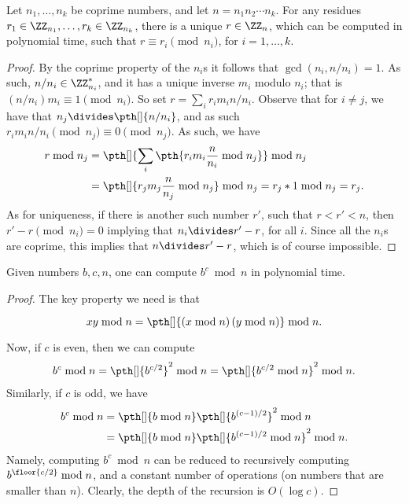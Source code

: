 \begin{theorem}%
    Let $n_1, \ldots, n_k$ be coprime numbers, and let $n = n_1 n_2
    \cdots n_k$. For any residues $r_1 \in \ZZ_{n_1}, \ldots, r_k \in
    \ZZ_{n_k}$, there is a unique $r \in \ZZ_n$, which can be computed
    in polynomial time, such that $r \equiv r_i \pmod{n_i}$, for $i=1,
    \ldots, k$.
\end{theorem}
\begin{proof}
    By the coprime property of the $n_i${}s it follows that $\gcd(n_i,
    n/n_i) = 1$. As such, $n/n_i \in \ZZ_{n_i}^*$, and it has a unique
    inverse $m_i$ modulo $n_i$; that is $(n/n_i) m_i \equiv 1
    \pmod{n_i}$. So set $r = \sum_i r_i m_i n/n_i$. Observe that for
    $i \neq j$, we have that $n_j \divides \pth[]{n/n_i}$, and as such
    $r_i m_i n/n_i \pmod{n_j} \equiv 0 \pmod{n_j}$. As such, we have
    \begin{align*}
        r \bmod{n_j}%
        &=%
        \pth[]{\sum_i \pth{ r_i m_i \frac{n}{n_i} \bmod{n_j}}}
        \bmod{n_j}\\
        &=%
        \pth[]{r_j m_j \frac{n}{n_j} \bmod{n_j}} \bmod{n_j}%
        =%
        r_j * 1 \bmod{n_j}%
        =%
        r_j.
    \end{align*}
    As for uniqueness, if there is another such number $r'$, such that
    $r < r' < n$, then $r' - r \pmod{n_i} = 0$ implying that $n_i
    \divides r' -r$, for all $i$. Since all the $n_i$s are coprime,
    this implies that $n \divides r' -r$, which is of course
    impossible.
\end{proof}

\begin{lemma}
    Given numbers $b,c, n$, one can compute $b^c \bmod n$ in
    polynomial time.
\end{lemma}

\begin{proof}
    The key property we need is that
    \begin{align*}
        x y \bmod n = \pth[]{\Bigl. (x\bmod n) \, (y \bmod n)} \bmod
        n.
    \end{align*}
    Now, if $c$ is even, then we can compute
    \begin{align*}
        b^c \bmod n%
        =%
        \pth[]{b^{c/2}}^2 \bmod n%
        =%
        \pth[]{b^{c/2} \bmod n }^2 \bmod n.%
    \end{align*}
    Similarly, if $c$ is odd, we have
    \begin{align*}
        b^c \bmod n%
        &=%
        \pth[]{b \bmod n} \pth[]{b^{(c-1)/2}}^2 \bmod n\\
        &=%
        \pth[]{b \bmod n} \pth[]{b^{(c-1)/2} \bmod n }^2 \bmod n.%
    \end{align*}
    Namely, computing $b^c \bmod n$ can be reduced to recursively
    computing $b^{\floor{c/2}} \bmod n$, and a constant number of
    operations (on numbers that are smaller than $n$). Clearly, the
    depth of the recursion is $O( \log c)$.
\end{proof}

